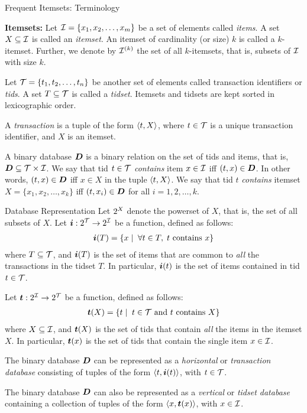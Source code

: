 \begin{frame}{Frequent Itemsets: Terminology}

{\bf Itemsets:}  
Let ${\mathcal I} = \{x_1, x_2, \ldots, x_m\}$ be a set of elements called
{\em items}.  A set $X \subseteq {\mathcal I}$ is called an {\em itemset}.
An itemset of cardinality
(or size) $k$ is called a $k$-itemset. Further, we denote by ${\mathcal I}^{(k)}$
the set of all $k$-itemsets, that is, subsets of ${\mathcal I}$ with size
$k$.  

Let ${\mathcal T} = \{t_1, t_2, \ldots, t_n\}$ be another set of
elements called transaction identif\/{i}ers or {\em tids}.  A set $T
\subseteq {\mathcal T}$ is called a {\em tidset}. 
Itemsets and tidsets are kept
sorted in lexicographic order.


A {\em transaction}
is a tuple of the form $\langle t,X \rangle$, where $t
\in {\mathcal T}$ is a unique transaction identif\/{i}er, and $X$ is an
itemset.  

A binary database ${\boldsymbol D}$ is a binary relation on the set of tids
 and items, that is, ${\boldsymbol D} \subseteq {\mathcal T}
\times {\mathcal I}$. We say that tid $t \in {\mathcal T}$ {\em contains} item $x
\in {\mathcal I}$ iff $(t,x) \in {\boldsymbol D}$.  In other words, $(t,x) \in {\boldsymbol D}$ iff
$x \in X$ in the tuple $\langle t,X \rangle$. We say that tid $t$ {\em
contains} itemset $X=\{x_1,x_2,\ldots,x_k\}$ iff $(t,x_i) \in {\boldsymbol D}$
for all $i=1,2,\ldots,k$.

\end{frame}


\begin{frame}{Database Representation}
Let $2^{X}$ denote the powerset of $X$, that is,
the set of all subsets of $X$.  Let ${{\boldsymbol i}}: 2^{{\mathcal T}} \to
2^{{\mathcal I}}$ be a function, def\/{i}ned as follows:
\begin{align*}
{{\boldsymbol i}}(T) = \{ x \mid\; \forall t\in T, \;t \mbox{ contains } x \}
\end{align*}
where $T \subseteq {\mathcal T}$, and ${{\boldsymbol i}}(T)$
is the set of items that are common to {\em
all} the transactions in the tidset $T$. In particular, ${{\boldsymbol i}}(t)$ is the
set of items contained in tid $t \in {\mathcal T}$. 

\medskip
Let ${{\boldsymbol t}}: 2^{{\mathcal I}} \to 2^{{\mathcal T}}$ be a function, def\/{i}ned as
follows:
\begin{align}
  {{\boldsymbol t}}(X) = \{ t \mid\; t \in {\mathcal T} \text{ and $t$ contains } X\}
\label{eq:fpm:iset:t}
\end{align}
where $X \subseteq {\mathcal I}$, and ${{\boldsymbol t}}(X)$ is the set of
tids that contain {\em
all} the items in the itemset $X$. In particular, ${{\boldsymbol t}}(x)$ is the
set of tids that contain the single item $x \in {\mathcal I}$.

\medskip
The binary database ${\boldsymbol D}$ can be represented as a
{\em horizontal} or 
{\em transaction database} consisting of tuples of the form
$\langle t,{{\boldsymbol i}}(t) \rangle$, with $t \in {\mathcal T}$. 

\medskip
The binary database ${\boldsymbol D}$ can also be represented as a
{\em vertical} or {\em tidset database} containing a collection of tuples of the form
$\langle x, {{\boldsymbol t}}(x) \rangle$, with $x\in {\mathcal I}$.  
\end{frame}


